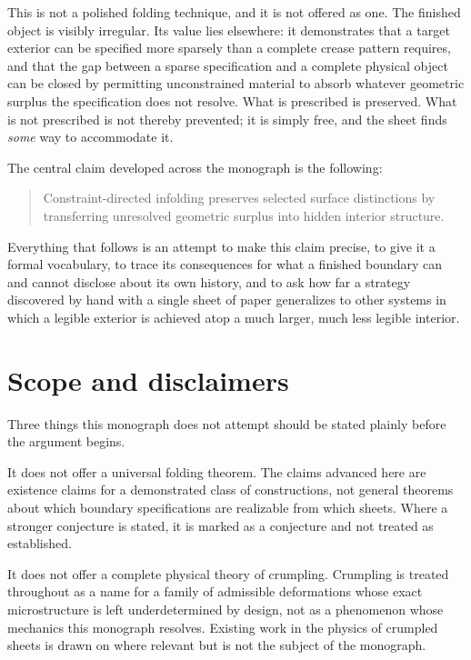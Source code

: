 \documentclass[11pt,oneside]{book}
\begin{document}
This is not a polished folding technique, and it is not offered as one.
The finished object is visibly irregular. Its value lies elsewhere: it
demonstrates that a target exterior can be specified more sparsely than
a complete crease pattern requires, and that the gap between a sparse
specification and a complete physical object can be closed by permitting
unconstrained material to absorb whatever geometric surplus the
specification does not resolve. What is prescribed is preserved. What is
not prescribed is not thereby prevented; it is simply free, and the
sheet finds \emph{some} way to accommodate it.

The central claim developed across the monograph is the following:

\begin{quote}
Constraint-directed infolding preserves selected surface distinctions by
transferring unresolved geometric surplus into hidden interior
structure.
\end{quote}

Everything that follows is an attempt to make this claim precise, to
give it a formal vocabulary, to trace its consequences for what a
finished boundary can and cannot disclose about its own history, and to
ask how far a strategy discovered by hand with a single sheet of paper
generalizes to other systems in which a legible exterior is achieved
atop a much larger, much less legible interior.

\hypertarget{scope-and-disclaimers}{%
\section{Scope and disclaimers}\label{scope-and-disclaimers}}

Three things this monograph does not attempt should be stated plainly
before the argument begins.

It does not offer a universal folding theorem. The claims advanced here
are existence claims for a demonstrated class of constructions, not
general theorems about which boundary specifications are realizable from
which sheets. Where a stronger conjecture is stated, it is marked as a
conjecture and not treated as established.

It does not offer a complete physical theory of crumpling. Crumpling is
treated throughout as a name for a family of admissible deformations
whose exact microstructure is left underdetermined by design, not as a
phenomenon whose mechanics this monograph resolves. Existing work in the
physics of crumpled sheets is drawn on where relevant but is not the
subject of the monograph.
\end{document}
